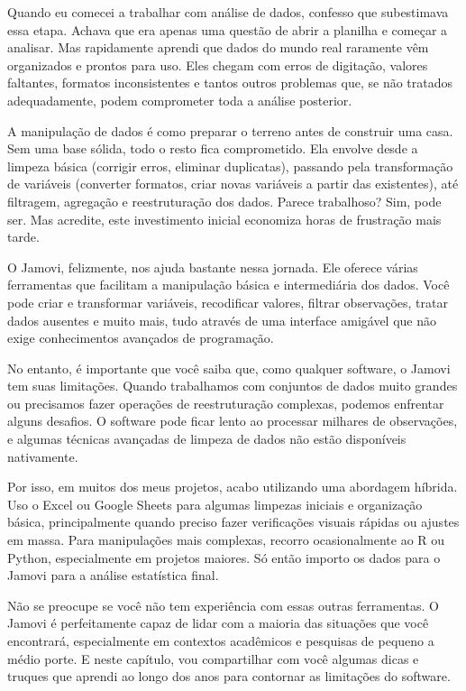 Quando eu comecei a trabalhar com análise de dados, confesso que subestimava essa etapa. Achava que era apenas uma questão de abrir a planilha e começar a analisar. Mas rapidamente aprendi que dados do mundo real raramente vêm organizados e prontos para uso. Eles chegam com erros de digitação, valores faltantes, formatos inconsistentes e tantos outros problemas que, se não tratados adequadamente, podem comprometer toda a análise posterior.

A manipulação de dados é como preparar o terreno antes de construir uma casa. Sem uma base sólida, todo o resto fica comprometido. Ela envolve desde a limpeza básica (corrigir erros, eliminar duplicatas), passando pela transformação de variáveis (converter formatos, criar novas variáveis a partir das existentes), até filtragem, agregação e reestruturação dos dados. Parece trabalhoso? Sim, pode ser. Mas acredite, este investimento inicial economiza horas de frustração mais tarde.

O Jamovi, felizmente, nos ajuda bastante nessa jornada. Ele oferece várias ferramentas que facilitam a manipulação básica e intermediária dos dados. Você pode criar e transformar variáveis, recodificar valores, filtrar observações, tratar dados ausentes e muito mais, tudo através de uma interface amigável que não exige conhecimentos avançados de programação.

No entanto, é importante que você saiba que, como qualquer software, o Jamovi tem suas limitações. Quando trabalhamos com conjuntos de dados muito grandes ou precisamos fazer operações de reestruturação complexas, podemos enfrentar alguns desafios. O software pode ficar lento ao processar milhares de observações, e algumas técnicas avançadas de limpeza de dados não estão disponíveis nativamente.

Por isso, em muitos dos meus projetos, acabo utilizando uma abordagem híbrida. Uso o Excel ou Google Sheets para algumas limpezas iniciais e organização básica, principalmente quando preciso fazer verificações visuais rápidas ou ajustes em massa. Para manipulações mais complexas, recorro ocasionalmente ao R ou Python, especialmente em projetos maiores. Só então importo os dados para o Jamovi para a análise estatística final.

Não se preocupe se você não tem experiência com essas outras ferramentas. O Jamovi é perfeitamente capaz de lidar com a maioria das situações que você encontrará, especialmente em contextos acadêmicos e pesquisas de pequeno a médio porte. E neste capítulo, vou compartilhar com você algumas dicas e truques que aprendi ao longo dos anos para contornar as limitações do software.

